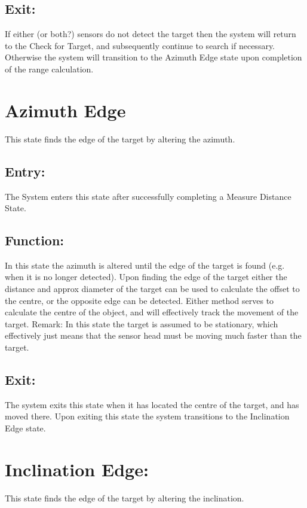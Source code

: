 \documentclass[]{article}
\begin{document}
\subsection{Exit:}
If either (or both?) sensors do not detect the target then the system will return to the Check for Target, and subsequently continue to search if necessary. Otherwise the system will transition to the Azimuth Edge state upon completion of the range calculation.

\section{Azimuth Edge} 
This state finds the edge of the target by altering the azimuth.

\subsection{Entry:}
The System enters this state after successfully completing a Measure Distance State.

\subsection{Function:}
In this state the azimuth is altered until the edge of the target is found (e.g. when it is no longer detected). Upon finding the edge of the target either the distance and approx diameter of the target can be used to calculate the offset to the centre, or the opposite edge can be detected. Either method serves to calculate the centre of the object, and will effectively track the movement of the target.
\newline
Remark: In this state the target is assumed to be stationary, which effectively just means that the sensor head must be moving much faster than the target.

\subsection{Exit:}
The system exits this state when it has located the centre of the target, and has moved there. Upon exiting this state the system transitions to the Inclination Edge state.

\section{Inclination Edge:}
This state finds the edge of the target by altering the inclination.
\end{document}
